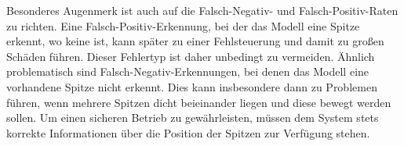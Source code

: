Besonderes Augenmerk ist auch auf die Falsch-Negativ- und Falsch-Positiv-Raten zu richten. Eine Falsch-Positiv-Erkennung, bei der das Modell eine Spitze erkennt, wo keine ist, kann später zu einer Fehlsteuerung und damit zu großen Schäden führen. Dieser Fehlertyp ist daher unbedingt zu vermeiden. 
Ähnlich problematisch sind Falsch-Negativ-Erkennungen, bei denen das Modell eine vorhandene Spitze nicht erkennt. Dies kann insbesondere dann zu Problemen führen, wenn mehrere Spitzen dicht beieinander liegen und diese bewegt werden sollen. Um einen sicheren Betrieb zu gewährleisten, müssen dem System stets korrekte Informationen über die Position der Spitzen zur Verfügung stehen.

